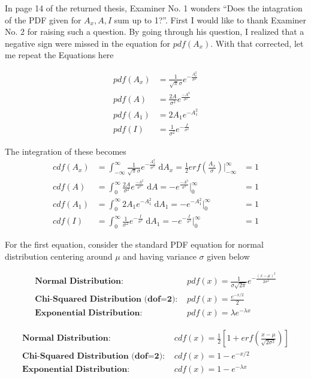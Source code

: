 In page 14 of the returned thesis, Examiner No. 1 wonders ``Does the intagration of the PDF given for $A_x, A, I$ sum up to 1?''.
First I would like to thank Examiner No. 2 for raising such a question.
By going through his question, I realized that a negative sign were missed in the equation for $pdf(A_x)$.
With that corrected, let me repeat the Equations here

\begin{align}
pdf(A_x) &= \frac{1}{\sqrt{\pi} \sigma} e^{- \frac{A_x^2}{\sigma^2}} \\
pdf(A)   &= \frac{2A}{\sigma^2} e^{\frac{-A^2}{\sigma^2}} \\
pdf(A_1) &= 2A_1 e^{-A_1^2} \\
pdf(I)   &= \frac{1}{\sigma^2} e^{-\frac{I}{\sigma^2}}
\end{align}

The integration of these becomes
\begin{align}
cdf(A_x) &= \int_{-\infty}^{\infty} \frac{1}{\sqrt{\pi} \sigma} e^{- \frac{A_x^2}{\sigma^2}}  \; \mathrm{d}A_x = \frac{1}{2} erf \left( \frac{A_x}{\sigma} \right)  \Big|_{-\infty}^{\infty} &= 1 \\
cdf(A) &= \int_0^{\infty} \frac{2A}{\sigma^2} e^{\frac{-A^2}{\sigma^2}}  \; \mathrm{d}A = -e^{\frac{-A^2}{\sigma^2}} \Big|_0^{\infty} &= 1\\
cdf(A_1) &= \int_0^{\infty} 2A_1 e^{-A_1^2} \; \mathrm{d}A_1 = -e^{-A_1^2} \Big|_0^{\infty} &= 1\\
cdf(I) &= \int_0^{\infty} \frac{1}{\sigma^2} e^{-\frac{I}{\sigma^2}} \; \mathrm{d}A_1 = -e^{-\frac{I}{\sigma^2}}  \Big|_0^{\infty} &= 1
\end{align}


For the first equation, consider the standard PDF equation for normal distribution centering around $\mu$ and having variance $\sigma$ given below

\begin{align}
\textbf{Normal Distribution: } & pdf(x) = \frac{1}{\sigma \sqrt{2\pi}} e^{- \frac{(x-\mu)^2}{2 \sigma^2}} \\
\textbf{Chi-Squared Distribution (dof=2): } & pdf(x) = \frac{e^{-x/2}}{2} \\ %
\textbf{Exponential Distribution: } & pdf(x) = \lambda e^{- \lambda x}
\end{align}

\begin{align}
\textbf{Normal Distribution: } & cdf(x) = \frac{1}{2} \left[ 1 + erf \left( \frac{x-\mu}{\sqrt{2\sigma^2}} \right) \right] \\
\textbf{Chi-Squared Distribution (dof=2): } & cdf(x) = 1 - e^{-x/2}\\
\textbf{Exponential Distribution: } & cdf(x) = 1 - e^{- \lambda x}
\end{align}

